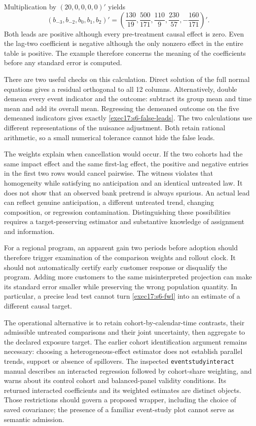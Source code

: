 Multiplication by $(20,0,0,0,0)'$ yields
\begin{equation}
 (b_{-3},b_{-2},b_0,b_1,b_2)'
 =\left(\frac{130}{19},\frac{500}{171},
          \frac{110}{9},\frac{230}{57},-\frac{160}{171}\right)'.
 \label{exec17:s6-false-leads}
\end{equation}
Both leads are positive although every pre-treatment causal effect is zero.
Even the lag-two coefficient is negative although the only nonzero effect
in the entire table is positive. The example therefore concerns the meaning
of the coefficients before any standard error is computed.

There are two useful checks on this calculation. Direct solution of the full
normal equations gives a residual orthogonal to all 12 columns. Alternatively,
double demean every event indicator and the outcome: subtract its group
mean and time mean and add its overall mean. Regressing the demeaned outcome
on the five demeaned indicators gives exactly
\eqref{exec17:s6-false-leads}. The two calculations use different
representations of the nuisance adjustment. Both retain rational arithmetic,
so a small numerical tolerance cannot hide the false leads.~\citep{exec17_s6_math}

The weights explain when cancellation would occur. If the two cohorts had
the same impact effect and the same first-lag effect, the positive and negative
entries in the first two rows would cancel pairwise. The witness violates
that homogeneity while satisfying no anticipation and an identical untreated
law. It does not show that an observed bank pretrend is always spurious.
An actual lead can reflect genuine anticipation, a different untreated trend,
changing composition, or regression contamination. Distinguishing these
possibilities requires a target-preserving estimator and substantive knowledge
of assignment and information.

For a regional program, an apparent gain two periods before adoption should
therefore trigger examination of the comparison weights and rollout clock.
It should not automatically certify early customer response or disqualify the
program. Adding more customers to the same misinterpreted projection can
make its standard error smaller while preserving the wrong population
quantity. In particular, a precise lead test cannot turn
\eqref{exec17:s6-fwl} into an estimate of a different causal target.

The operational alternative is to retain cohort-by-calendar-time contrasts,
their admissible untreated comparisons and their joint uncertainty, then
aggregate to the declared exposure target. The earlier cohort identification
argument remains necessary: choosing a heterogeneous-effect estimator does
not establish parallel trends, support or absence of spillovers.
The inspected \texttt{eventstudyinteract} manual describes an interacted
regression followed by cohort-share weighting, and warns about its control
cohort and balanced-panel validity conditions. Its returned interacted
coefficients and its weighted estimates are distinct objects.
Those restrictions should govern a proposed wrapper, including the choice
of saved covariance; the presence of a familiar event-study plot cannot
serve as semantic admission.~\citep{v12_sw_eventstudyinteract}

